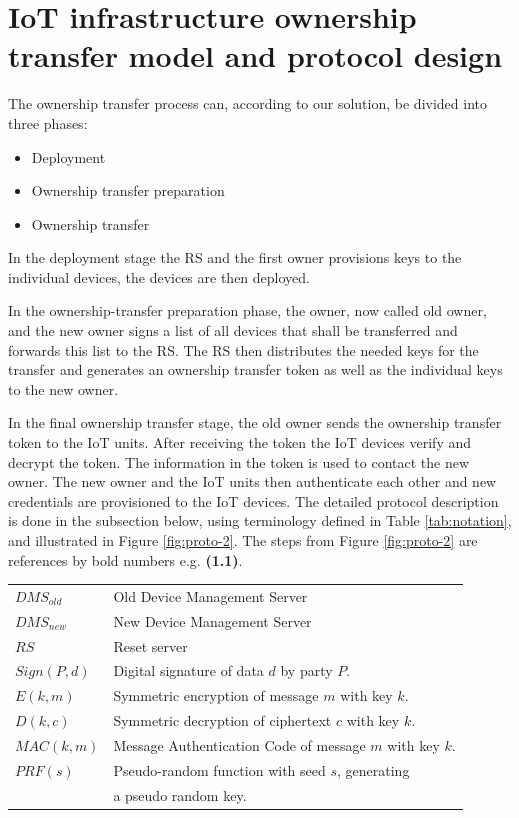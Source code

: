 {\section{IoT infrastructure ownership transfer model and protocol design}
\label{Solution}
The ownership transfer process can, according to our solution, be divided into three phases:
\begin{itemize}
\item Deployment
\item Ownership transfer preparation
\item Ownership transfer
\end{itemize}
In the deployment stage the RS and the first owner provisions keys to the individual devices, the devices are then deployed.

In the ownership-transfer preparation phase, the owner, now called old owner, and the new owner signs a list of all devices that shall be transferred and forwards this list to the RS. The RS then distributes the needed keys for the transfer and generates an ownership transfer token as well as the individual keys to the new owner.

In the final ownership transfer stage, the old owner sends the ownership transfer token to the IoT units. After receiving the token the IoT devices verify and decrypt the token. The information in the token is used to contact the new owner. The new owner and the IoT units then authenticate each other and new credentials are provisioned to the IoT devices. The detailed protocol description is done in the subsection below, using terminology defined in Table \ref{tab:notation}, and illustrated in Figure \ref{fig:proto-2}. The steps from Figure \ref{fig:proto-2} are references by bold numbers e.g. \textbf{(1.1)}.

\begin{table}

\footnotesize{
\begin{tabularx}{.47\textwidth}{l m{5cm}}
\hline
      $DMS_{old}$ & Old Device Management Server  \\
      $DMS_{new}$ & New Device Management Server  \\
      $RS$ &Reset server  \\
    
      $Sign(P, d)$ & Digital signature of data $d$ by party $P$.  \\
      $E(k,m)$  & Symmetric encryption of message $m$ with key $k$.  \\
      $D(k,c)$  & Symmetric decryption of ciphertext $c$ with key $k$.  \\
      $MAC(k,m)$  & Message Authentication Code of message $m$ with key $k$.  \\
      $PRF(s)$ & Pseudo-random function with seed $s$, generating  \\
               & a pseudo random key. \\
    

\end{tabularx}}
\end{table}}
